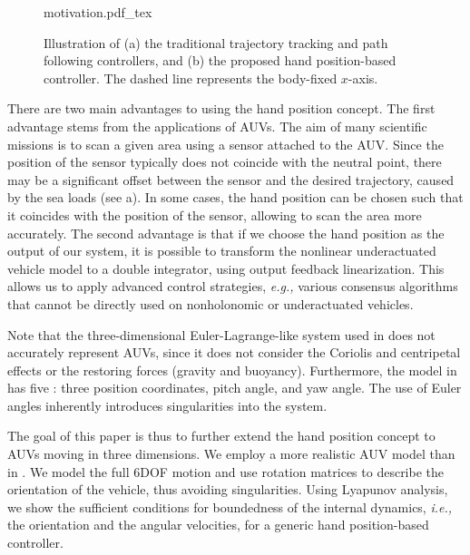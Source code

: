 \begin{figure}[t]
    \centering
    \def\svgwidth{0.75\textwidth}
    {motivation.pdf_tex}
    \caption{Illustration of (a) the traditional trajectory tracking and path following controllers, and (b) the proposed hand position-based controller. The dashed line represents the body-fixed $x$-axis.}
    \label{fig:handpos_def_motivation}
\end{figure}

There are two main advantages to using the hand position concept.
The first advantage stems from the applications of AUVs.
The aim of many scientific missions is to scan a given area using a sensor attached to the AUV.
Since the position of the sensor typically does not coincide with the neutral point, there may be a significant offset between the sensor and the desired trajectory, caused by the sea loads (see a).
In some cases, the hand position can be chosen such that it coincides with the position of the sensor, allowing to scan the area more accurately.
The second advantage is that if we choose the hand position as the output of our system, it is possible to transform the nonlinear underactuated vehicle model to a double integrator, using output feedback linearization.
This allows us to apply advanced control strategies, \emph{e.g.,} various consensus algorithms \cite{cai_hand-position-rigidity-planar_2015,li_hand-position-rigidity-3d_2021,lawton_hand-position-formation_2003,restrepo_tracking-formation_2022} that cannot be directly used on nonholonomic or underactuated vehicles.

Note that the three-dimensional Euler-Lagrange-like system used in \cite{li_hand-position-rigidity-3d_2021} does not accurately represent AUVs, since it does not consider the Coriolis and centripetal effects or the restoring forces (gravity and buoyancy).
Furthermore, the model in \cite{li_hand-position-rigidity-3d_2021} has five : three position coordinates, pitch angle, and yaw angle.
The use of Euler angles inherently introduces singularities into the system.

The goal of this paper is thus to further extend the hand position concept to AUVs moving in three dimensions.
We employ a more realistic AUV model than in \cite{li_hand-position-rigidity-3d_2021}. We model the full 6DOF motion and use rotation matrices to describe the orientation of the vehicle, thus avoiding singularities.
Using Lyapunov analysis, we show the sufficient conditions for boundedness of the internal dynamics, \emph{i.e.,} the orientation and the angular velocities, for a generic hand position-based controller.

